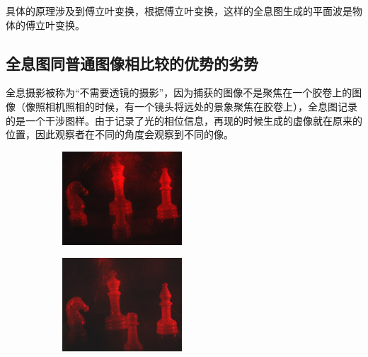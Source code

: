 \documentclass{article}
\begin{document}
\begin{multicols}{2}
具体的原理涉及到傅立叶变换，根据傅立叶变换，这样的全息图生成的平面波是物体的傅立叶变换。

\subsection{全息图同普通图像相比较的优势的劣势}

全息摄影被称为“不需要透镜的摄影”，因为捕获的图像不是聚焦在一个胶卷上的图像（像照相机照相的时候，有一个镜头将远处的景象聚焦在胶卷上），全息图记录的是一个干涉图样。由于记录了光的相位信息，再现的时候生成的虚像就在原来的位置，因此观察者在不同的角度会观察到不同的像。

\begin{figure}[H]
  \centering
  \begin{subfigure}{0.96\linewidth}
    \includegraphics[width=\linewidth]{figures/全息拍摄中}
  \end{subfigure}
  \begin{subfigure}{0.48\linewidth}
    \includegraphics[width=\linewidth]{figures/全息拍摄左}

\end{subfigure}
\end{figure}
\end{multicols}
\end{document}
